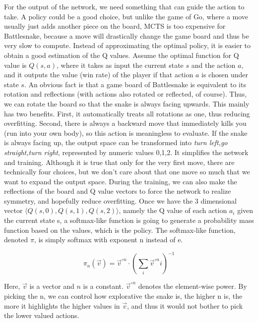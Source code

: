 \documentclass{article}
\begin{document}
For the output of the network, we need something that can guide the action to
take. A policy could be a good choice, but unlike the game of Go, where a move
usually just adds another piece on the board, MCTS is too expensive for
Battlesnake, because a move will drastically change the game board and thus be very
slow to compute. Instead of approximating the optimal policy, it is easier to
obtain a good estimation of the Q values. Assume the optimal function for Q
value is $Q(s,a)$, where it takes as input the current state $s$ and the action
$a$, and it outputs the value (win rate) of the player if that action $a$ is
chosen under state $s$. An obvious fact is that a game board of Battlesnake is
equivalent to its rotation and reflections (with actions also rotated or
reflected, of course). Thus, we can rotate the board so that the snake is always
facing upwards. This mainly has two benefits. First, it automatically treats all
rotations as one, thus reducing overfitting. Second, there is always a backward
move that immediately kills you (run into your own body), so this action is
meaningless to evaluate. If the snake is always facing up, the output space can
be transformed into \textit{turn left,go straight,turn right}, represented by
numeric values {0,1,2}. It simplifies the network and training. Although it is
true that only for the very first move, there are technically four choices, but
we don't care about that one move so much that we want to expand the output
space. During the training, we can also make the reflections of the board and Q
value vectors to force the network to realize symmetry, and hopefully reduce
overfitting. Once we have the 3 dimensional vector $\langle Q(s,0),Q(s,1),Q(s,2)
  \rangle$, namely the Q value of each action $a_i$ given the current state s, a
softmax-like function is going to generate a probability mass function based on
the values, which is the policy. The softmax-like function, denoted $\pi$, is simply
softmax with exponent n instead of e.

\begin{equation}
  \pi_n(\overrightarrow{v})=\overrightarrow{v}^{\circ n}\cdot(\sum\limits_i \overrightarrow{v}^{\circ n}i)^{-1}
\end{equation}

Here, $\overrightarrow{v}$ is a vector and $n$ is a constant.
$\overrightarrow{v}^{\circ n}$ denotes the element-wise power. By picking
the n, we can control how explorative the snake is, the higher n is, the
more it highlights the higher values in $\overrightarrow{v}$, and thus it
would not bother to pick the lower valued actions.
\end{document}
